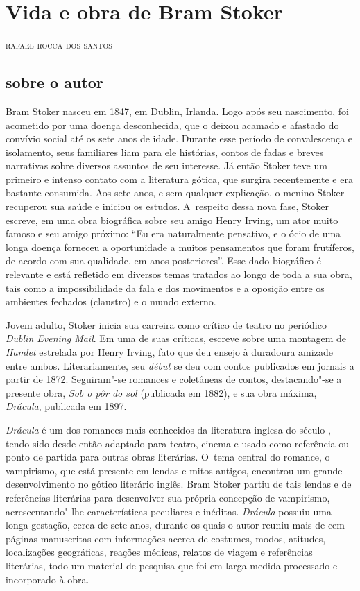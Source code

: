 \chapter{Vida e obra de Bram Stoker}

\begin{flushright}
\textsc{rafael rocca dos santos}\bigskip
\end{flushright}

\section{sobre o autor}

\noindent{}Bram Stoker nasceu em 1847, em Dublin, Irlanda. Logo após seu
nascimento, foi acometido por uma doença desconhecida, que o deixou
acamado e afastado do convívio social até os sete anos de idade. Durante
esse período de convalescença e isolamento, seus familiares liam para
ele histórias, contos de fadas e breves narrativas sobre diversos
assuntos de seu interesse. Já então Stoker teve um primeiro e
intenso contato com a literatura gótica, que surgira recentemente e era
bastante consumida. Aos sete anos, e sem qualquer explicação, o menino
Stoker recuperou sua saúde e iniciou os estudos. A~respeito dessa nova
fase, Stoker escreve, em uma obra biográfica sobre seu amigo Henry
Irving, um ator muito famoso e seu amigo próximo: ``Eu era naturalmente
pensativo, e o ócio de uma longa doença forneceu a oportunidade a muitos
pensamentos que foram frutíferos, de acordo com sua qualidade, em anos
posteriores''. Esse dado biográfico é relevante e está refletido em
diversos temas tratados ao longo de toda a sua obra, tais como a
impossibilidade da fala e dos movimentos e a oposição entre os ambientes
fechados (claustro) e o mundo externo.

Jovem adulto, Stoker inicia sua carreira como crítico de teatro no
periódico \emph{Dublin Evening Mail}. Em uma de suas críticas, escreve
sobre uma montagem de \emph{Hamlet} estrelada por Henry Irving, fato que
deu ensejo à duradoura amizade entre ambos. Literariamente, seu
\emph{début} se deu com contos publicados em jornais a partir de 1872.
Seguiram"-se romances e coletâneas de contos, destacando"-se a presente
obra, \emph{Sob o pôr do sol} (publicada em 1882), e sua obra máxima,
\emph{Drácula}, publicada em 1897.

\emph{Drácula} é um dos romances mais conhecidos da literatura inglesa
do século , tendo sido desde então adaptado para teatro, cinema e
usado como referência ou ponto de partida para outras obras literárias.
O~tema central do romance, o vampirismo, que está presente em lendas e
mitos antigos, encontrou um grande desenvolvimento no gótico literário
inglês. Bram Stoker partiu de tais lendas e de referências literárias
para desenvolver sua própria concepção de vampirismo, acrescentando"-lhe
características peculiares e inéditas. \emph{Drácula} possuiu uma longa
gestação, cerca de sete anos, durante os quais o autor reuniu mais de
cem páginas manuscritas com informações acerca de costumes, modos,
atitudes, localizações geográficas, reações médicas, relatos de viagem e
referências literárias, todo um material de pesquisa que foi em larga
medida processado e incorporado à obra.


